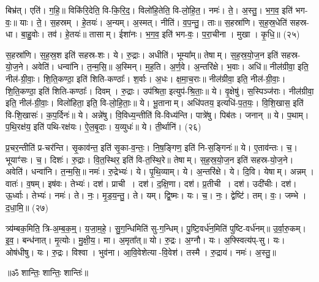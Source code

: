 बिभ्र॑त्। एति॑। ग॒हि॒॥ 
विकि॑रि॒देति॒ वि-कि॒रि॒द॒। विलो॑हि॒तेति॒ वि-लो॒हि॒त॒। नमः॑। ते॒। अ॒स्तु॒। भ॒ग॒व॒ इति॑ भग-वः॒॥ 
याः। ते॒। स॒हस्रम्। हे॒तयः॑। अ॒न्यम्। अ॒स्मत्। नीति॑। व॒प॒न्तु॒। ताः॥ 
स॒हस्रा॑णि। स॒ह॒स्र॒धेति॑ सहस्र-धा। बा॒हु॒वोः। तव॑। हे॒तयः॑॥ 
तासाम्। ईशा॑नः। भ॒ग॒व॒ इति॑ भग-वः॒। प॒रा॒चीना। मुखा। कृ॒धि॒॥ (२५)


स॒हस्रा॑णि। स॒ह॒स्र॒श इति॑ सहस्र-शः। ये। रु॒द्राः। अधीति॑। भूम्या᳚म्॥ 
तेषाम्। स॒ह॒स्र॒यो॒ज॒न इति॑ सहस्र-यो॒ज॒ने। अवेति॑। धन्वा॑नि। त॒न्म॒सि॒॥ 
अ॒स्मिन्। म॒ह॒ति। अ॒र्ण॒वे। अ॒न्तरि॑क्षे। भ॒वाः। अधि॑॥ 
नील॑ग्रीवा॒ इति॒ नील॑-ग्री॒वाः॒। शि॒ति॒कण्ठा॒ इति॑ शिति-कण्ठाः᳚। श॒र्वाः। अ॒धः। क्ष॒मा॒च॒राः॥ 
नील॑ग्रीवा॒ इति॒ नील॑-ग्री॒वाः॒। शि॒ति॒कण्ठा॒ इति॑ शिति-कण्ठाः᳚। दिवम्। रु॒द्राः। उप॑श्रिता॒ इत्युप॑-श्रि॒ताः॒॥ 
ये। वृ॒क्षेषु॑। स॒स्पिञ्ज॑राः। नील॑ग्रीवा॒ इति॒ नील॑-ग्री॒वाः॒। विलो॑हिता॒ इति॒ वि-लो॒हि॒ताः॒॥ 
ये। भू॒तानाम्। अधि॑पतय॒ इत्यधि॑-प॒त॒यः॒। वि॒शि॒खास॒ इति॑ वि-शि॒खासः॑। क॒प॒र्दिनः॑॥ 
ये। अन्ने॑षु। वि॒विध्य॒न्तीति॑ वि-विध्य॑न्ति। पात्रे॑षु। पिब॑तः। जनान्॥ 
ये। प॒थाम्। प॒थि॒रक्ष॑य॒ इति॑ पथि-रक्ष॑यः। ऐ॒ल॒बृ॒दाः। य॒व्युधः॑॥ 
ये। ती॒र्थानि॑। (२६)


प्र॒चर॒न्तीति॑ प्र-चर॑न्ति। सृ॒काव॑न्त॒ इति॑ सृ॒का-व॒न्तः॒। नि॒ष॒ङ्गिण॒ इति॑ नि-स॒ङ्गिनः॑॥ 
ये। ए॒ताव॑न्तः। च॒। भूयाꣳ॑सः। च॒। दिशः॑। रु॒द्राः। वि॒त॒स्थिर॒ इति॑ वि-त॒स्थि॒रे॥ 
तेषाम्। स॒ह॒स्र॒यो॒ज॒न इति॑ सहस्र-यो॒ज॒ने। अवेति॑। धन्वा॑नि। त॒न्म॒सि॒॥ 
नमः॑। रु॒द्रेभ्यः॑। ये। पृ॒थि॒व्याम्। ये। अ॒न्तरि॑क्षे। ये। दि॒वि। येषाम्। अन्नम्। वातः॑। व॒\ar{}षम्।
 इष॑वः। तेभ्यः॑। दश॑। प्राची। दश॑। द॒क्षि॒णा। दश॑। प्र॒तीची। दश॑। उदी॑चीः। दश॑। ऊ॒र्ध्वाः।
  तेभ्यः॑। नमः॑। ते। नः॒। मृ॒ड॒य॒न्तु॒। ते। यम्। द्वि॒ष्मः। यः। च॒। नः॒। द्वेष्टि॑। तम्। वः॒। जम्भे। द॒धा॒मि॒॥ (२७)

त्र्य॑म्बक॒मिति॒ त्रि-अ॒म्ब॒क॒म्॒। य॒जा॒म॒हे॒। सु॒ग॒न्धिमिति॑ सु-ग॒न्धिम्। पु॒ष्टि॒वर्ध॑न॒मिति॑ पुष्टि-वर्ध॑नम्॥ 
उ॒र्वा॒रु॒कम्। इ॒व॒। बन्ध॑नात्। मृ॒त्योः। मु॒क्षी॒य॒। मा। अ॒मृता᳚त्॥ 
यो। रु॒द्रः। अ॒ग्नौ। यः। अ॒फ्स्वित्य॑प्-सु। यः। ओष॑धीषु। यः। रु॒द्रः। विश्वा। भुव॑ना। आ॒वि॒वेशेत्या-वि॒वेश॑। तस्मै। रु॒द्राय॑। नमः॑। अ॒स्तु॒॥

\centerline{॥ॐ शान्तिः॒ शान्तिः॒ शान्तिः॑॥}



